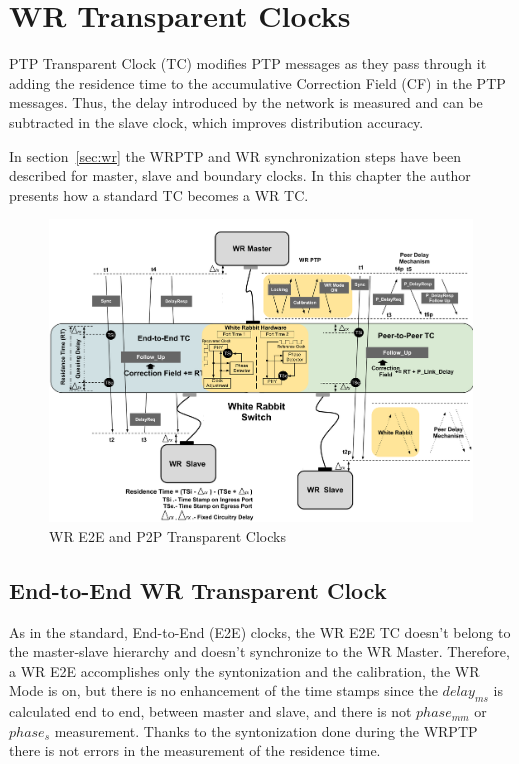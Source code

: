 \section{WR Transparent Clocks}
\label{sec:wr_tc}
PTP Transparent Clock (TC) modifies PTP messages as they pass through it
adding the residence time to the accumulative Correction Field (CF) in the PTP 
messages. Thus, the delay introduced  by the network is measured and can be 
subtracted in the slave clock, which improves distribution accuracy.

In section~\ref{sec:wr} the WRPTP and WR synchronization steps have been described for
master, slave and boundary clocks. In this chapter the author presents how a
standard TC becomes a WR TC.

\begin{figure}[!t]
\centering
\includegraphics[scale=0.27]{fig/wr_schema_hw_bw.png}
\caption{WR E2E and P2P Transparent Clocks}
\label{fig:wr_tc}
\end{figure}

\subsection{End-to-End WR Transparent Clock}

As in the standard, End-to-End (E2E) clocks, the WR E2E TC doesn't belong to the
master-slave hierarchy and doesn't synchronize to the WR Master. 
Therefore, a WR E2E accomplishes only the syntonization and the calibration,
the WR Mode is on, but there is no enhancement of the time stamps since the  
$delay_{ms}$ is calculated end to end, between master and slave, and there is 
not $phase_{mm}$ or $phase_{s}$ measurement. Thanks to the syntonization done 
during the WRPTP there is not errors in the 
measurement of the residence time.

